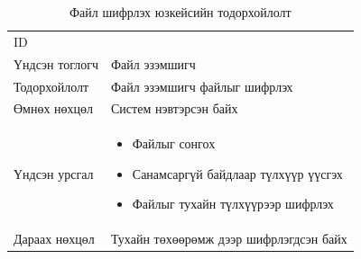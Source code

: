 \begin{table}[H]
    \footnotesize
    \centering
    \begin{tabularx}{\textwidth}{|>{\hsize=0.3\hsize}X|>{\hsize=0.7\hsize}X|}
        \hline
        \multicolumn{2}{|c|}{Файл шифрлэх}                      \\
        \hline
        ID             & 3                                      \\
        \hline
        Үндсэн тоглогч & Файл эзэмшигч                          \\
        \hline
        Тодорхойлолт   & Файл эзэмшигч файлыг шифрлэх           \\
        \hline
        Өмнөх нөхцөл   & Систем нэвтэрсэн байх                  \\
        \hline
        Үндсэн урсгал  &
        \begin{minipage}{\linewidth}
            \begin{itemize}
                \item Файлыг сонгох
                \item Санамсаргүй байдлаар түлхүүр үүсгэх
                \item Файлыг тухайн түлхүүрээр шифрлэх
            \end{itemize}
        \end{minipage}
        \\
        \hline
        Дараах нөхцөл  & Тухайн төхөөрөмж дээр шифрлэгдсэн байх \\
        \hline
    \end{tabularx}
    \caption{Файл шифрлэх юзкейсийн тодорхойлолт}
\end{table}

